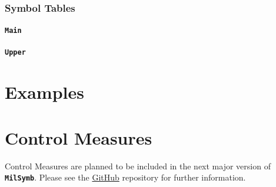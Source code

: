 \documentclass[a4paper, titlepage]{article}
\begin{document}
\subsubsection{Symbol Tables}

\paragraph{\texttt{Main}}

\paragraph{\texttt{Upper}}

\section{Examples}

\section{Control Measures}

Control Measures are planned to be included in the next major version of \textbf{\texttt{MilSymb}}. Please see the \href{https://github.com/ralphieraccoon/MilSymb}{GitHub} repository for further information.

%
%
%
%
%
%
%
%
%
%
%
%
%
%
%
%
%
%
%
%
%
%
%
%
%
%
%
%
%
%
%
\end{document}
